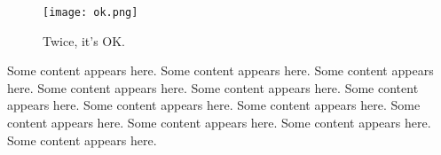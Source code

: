 \begin{figure}[hbt!]
  \centering
  \texttt{[image: ok.png]}
  \caption{Twice, it's OK.}
  \label{fig:ok0.0}
\end{figure}

Some content appears here. Some content appears here. Some content appears here. Some content appears here. Some content appears here. Some content appears here.
Some content appears here. Some content appears here. Some content appears here.
Some content appears here. Some content appears here. Some content appears here.
